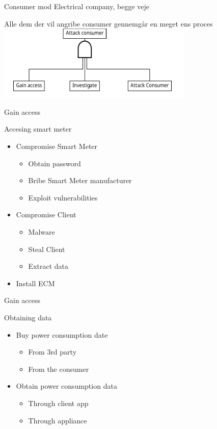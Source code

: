 \begin{frame}
  Consumer mod Electrical company, begge veje
\end{frame}

\begin{frame}
  Alle dem der vil angribe consumer gennemgår en meget ens proces
\center
  \includegraphics[width=0.7\textwidth]{graphics/common_attack.pdf}
\end{frame}

\begin{frame}{Gain access}
  \begin{block}{Accesing smart meter}
    \begin{itemize}
      \item Compromise Smart Meter
      \begin{itemize}
        \item Obtain password
        \item Bribe Smart Meter manufacturer
        \item Exploit vulnerabilities
      \end{itemize}
      \item Compromise Client
      \begin{itemize}
        \item Malware
        \item Steal Client
        \item Extract data
      \end{itemize}
      \item Install ECM
    \end{itemize}
  \end{block}
\end{frame}

\begin{frame}{Gain access}
  \begin{block}{Obtaining data }
    \begin{itemize}
      \item Buy power consumption date
      \begin{itemize}
        \item From 3rd party
        \item From the consumer
      \end{itemize}
      \item Obtain power consumption data
      \begin{itemize}
        \item Through client app
        \item Through appliance
      \end{itemize}
    \end{itemize}
  \end{block}
\end{frame}

